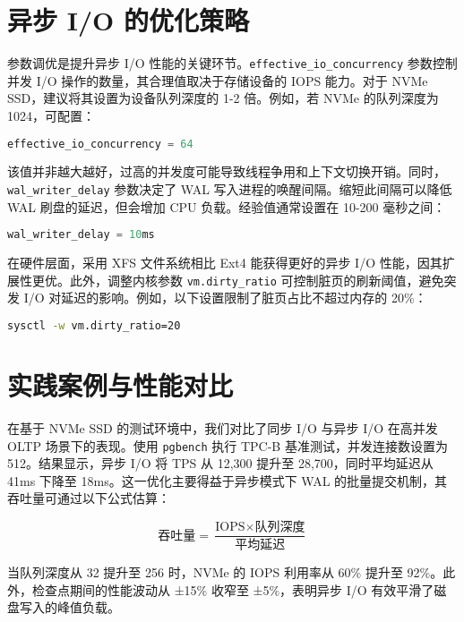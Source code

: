 \chapter{异步 I/O 的优化策略}
参数调优是提升异步 I/O 性能的关键环节。\verb!effective_io_concurrency! 参数控制并发 I/O 操作的数量，其合理值取决于存储设备的 IOPS 能力。对于 NVMe SSD，建议将其设置为设备队列深度的 1-2 倍。例如，若 NVMe 的队列深度为 1024，可配置：\par
\begin{lstlisting}[language=sql]
effective_io_concurrency = 64
\end{lstlisting}
该值并非越大越好，过高的并发度可能导致线程争用和上下文切换开销。同时，\verb!wal_writer_delay! 参数决定了 WAL 写入进程的唤醒间隔。缩短此间隔可以降低 WAL 刷盘的延迟，但会增加 CPU 负载。经验值通常设置在 10-200 毫秒之间：\par
\begin{lstlisting}[language=sql]
wal_writer_delay = 10ms
\end{lstlisting}
在硬件层面，采用 XFS 文件系统相比 Ext4 能获得更好的异步 I/O 性能，因其扩展性更优。此外，调整内核参数 \verb!vm.dirty_ratio! 可控制脏页的刷新阈值，避免突发 I/O 对延迟的影响。例如，以下设置限制了脏页占比不超过内存的 20\%{}：\par
\begin{lstlisting}[language=bash]
sysctl -w vm.dirty_ratio=20
\end{lstlisting}
\chapter{实践案例与性能对比}
在基于 NVMe SSD 的测试环境中，我们对比了同步 I/O 与异步 I/O 在高并发 OLTP 场景下的表现。使用 \verb!pgbench! 执行 TPC-B 基准测试，并发连接数设置为 512。结果显示，异步 I/O 将 TPS 从 12,300 提升至 28,700，同时平均延迟从 41ms 下降至 18ms。这一优化主要得益于异步模式下 WAL 的批量提交机制，其吞吐量可通过以下公式估算：\par
$$ \text{吞吐量} = \frac{\text{IOPS} \times \text{队列深度}}{\text{平均延迟}} $$\par
当队列深度从 32 提升至 256 时，NVMe 的 IOPS 利用率从 60\%{} 提升至 92\%{}。此外，检查点期间的性能波动从 ±15\%{} 收窄至 ±5\%{}，表明异步 I/O 有效平滑了磁盘写入的峰值负载。\par
